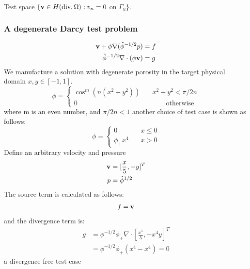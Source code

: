 Test space $\{\bold{v} \in H(\text{div},\Omega): v_n =0$ on $\Gamma_u\}$.

\subsubsection{A degenerate Darcy test problem}
\begin{equation}
		  \begin{aligned}
					 \bold{v} + \phi\nabla(\hat{\phi}^{-1/2}p) &= f\\
					 \hat{\phi}^{-1/2}\nabla \cdot (\phi\bold{v})&= g
		  \end{aligned}
\end{equation}
We manufacture a solution with degenerate porosity in the target physical domain $x,y\in[-1,1]$.
\begin{equation}
		  \phi = \left \{
					 \begin{aligned}
								\cos^m(n(x^2+y^2)) \quad & x^2+y^2 < \pi/2n\\
							0  \quad   & \qquad \text{otherwise}
					 \end{aligned}
					 \right.
\end{equation}
where m is an even number, and $\pi/2n < 1$
another choice of test case is shown as follows:
\begin{equation}
		  \phi = \left \{
					 \begin{aligned}
								0 & \quad x \leq 0 \\
								\phi_{+} x^4 & \quad x>0 
					 \end{aligned}
					 \right .
\end{equation}
Define an arbitrary velocity and pressure 
\begin{equation}
		  \begin{aligned}
					 \bold{v} &= [\frac{x}{5}, -y]^T \\
					 p & = \hat{\phi}^{1/2}
		  \end{aligned}
\end{equation}
The source term is calculated as follows:
\begin{equation}
		  \begin{aligned}
					 f &= \bold{v} \\
		  \end{aligned}
\end{equation}
and the divergence term is:
\begin{equation}
		  \begin{aligned}
					 g &= \phi^{-1/2}\phi_+\nabla \cdot [\frac{x^5}{5}, -x^4y]^T \\
					   &= \phi^{-1/2}\phi_+(x^4 - x^4) = 0
		  \end{aligned}
\end{equation}
a divergence free test case

